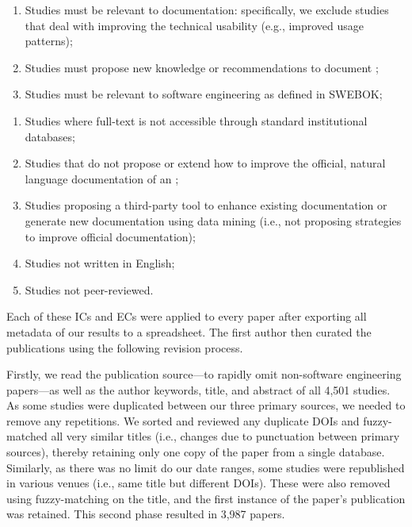 \begin{enumerate}[leftmargin=2\parindent,label=\textbf{IC\arabic*}]
  \item Studies must be relevant to  documentation: specifically, we exclude studies that deal with improving the technical  usability (e.g., improved usage patterns);
  \item Studies must propose new knowledge or recommendations to document ;
  \item Studies must be relevant to software engineering as defined in SWEBOK;
\end{enumerate}
\begin{enumerate}[leftmargin=2\parindent,label=\textbf{EC\arabic*}]
  \item Studies where full-text is not accessible through standard institutional databases; 
  \item Studies that do not propose or extend how to improve the official, natural language documentation of an ;
  \item Studies proposing a third-party tool to enhance existing documentation or generate new documentation using data mining (i.e., not proposing strategies to improve official documentation);
  \item Studies not written in English;
  \item Studies not peer-reviewed.
\end{enumerate}
\smallskip

Each of these ICs and ECs were applied to every paper  after exporting all  metadata of our results to a spreadsheet. The first author then curated the publications using the following revision process.

Firstly, we read the publication source---to rapidly omit non-software engineering papers---as well as the author keywords, title, and abstract of all 4,501 studies. As some studies were duplicated between our three primary sources, we needed to remove any repetitions. We sorted and reviewed any duplicate DOIs and fuzzy-matched all very similar titles (i.e., changes due to punctuation between primary sources), thereby retaining only one copy of the paper from a single database. Similarly, as there was no limit do our date ranges, some studies were republished in various venues (i.e., same title but different DOIs). These were also removed using fuzzy-matching on the title, and the first instance of the paper's publication was retained. This second phase resulted in 3,987 papers.

